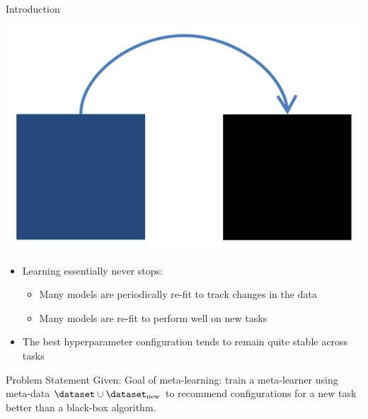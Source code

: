 
\begin{frame}[c]{Introduction}

	\begin{center}
		\includegraphics[width=0.2\linewidth, keepaspectratio=true]{images/intro/meta-learning.png}
	\end{center}
				
	\begin{itemize}
		\item Learning essentially never stops:
		\begin{itemize}
			\item Many models are periodically re-fit to track changes in the data
			\item Many models are re-fit to perform well on new tasks
		\end{itemize}
		\item The best hyperparameter configuration tends to remain quite stable across tasks
	\end{itemize}		
\end{frame}

\begin{frame}[c]{Problem Statement}
		Given:
		\bigskip
\pause
		\alert{Goal of meta-learning:} train a meta-learner using meta-data $\dataset \cup \dataset_{\text{new}}$ to recommend configurations for a new task better than a black-box algorithm. 

\hspace{11cm}
\end{frame}


